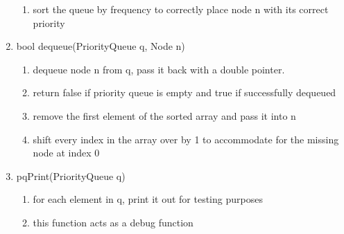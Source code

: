 \documentclass[11pt]{article}
\begin{document}
\begin{enumerate}
\begin{enumerate}
	\item sort the queue by frequency to correctly place node n with its correct priority
	\end{enumerate}
\item bool dequeue(PriorityQueue q, Node n)
	\begin{enumerate}
	\item dequeue node n from q, pass it back with a double pointer.
	\item return false if priority queue is empty and true if successfully dequeued
	\item remove the first element of the sorted array and pass it into n
	\item shift every index in the array over by 1 to accommodate for the missing node at index 0
	\end{enumerate}
\item pqPrint(PriorityQueue q)
	\begin{enumerate}
	\item for each element in q, print it out for testing purposes
	\item this function acts as a debug function
	\end{enumerate}
\end{enumerate}
\end{document}
